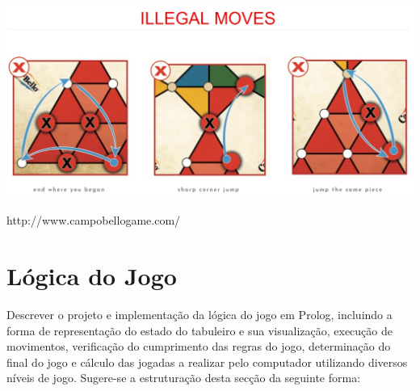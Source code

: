 \documentclass[a4paper]{article}
\begin{document}
\includegraphics[scale=0.3]{illegalMoves.PNG}\linebreak\linebreak

http://www.campobellogame.com/


\section{Lógica do Jogo}

Descrever o projeto e implementação da lógica do jogo em Prolog, incluindo a forma de representação do estado do tabuleiro e sua visualização, execução de movimentos, verificação do cumprimento das regras do jogo, determinação do final do jogo e cálculo das jogadas a realizar pelo computador utilizando diversos níveis de jogo. Sugere-se a estruturação desta secção da seguinte forma:
\end{document}
